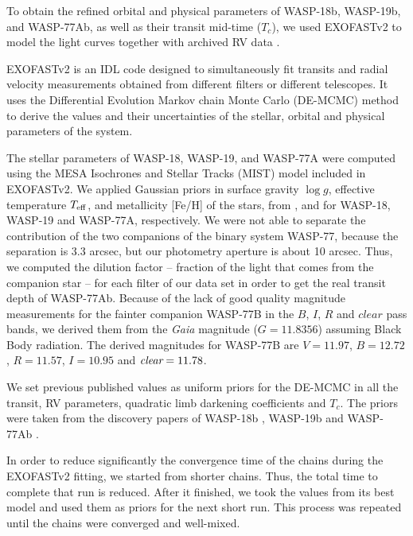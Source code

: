 To obtain the refined orbital and physical parameters of WASP-18b, WASP-19b, and WASP-77Ab, as well as their transit mid-time ($T_{c}$), we used EXOFASTv2 \citep{Eastman2013,Eastman2017} to model the light curves together with archived RV data \cite{Hellier2009, Hebb2010, Maxted2013}.

EXOFASTv2 is an IDL code designed to simultaneously fit transits and radial velocity measurements obtained from different filters or different telescopes. It uses the Differential Evolution Markov chain Monte Carlo (DE-MCMC) method to derive the values and their uncertainties of the stellar, orbital and physical parameters of the system. 

The stellar parameters of WASP-18, WASP-19, and WASP-77A were computed using the MESA Isochrones and Stellar Tracks (MIST) model \citep{Dotter2016} included in EXOFASTv2. We applied Gaussian priors in surface gravity $\log{g}$, effective temperature $T_{\rm eff}$, and metallicity [Fe/H] of the stars, from \cite{Hellier2009},\cite{Hebb2010} and \cite{Maxted2013} for WASP-18, WASP-19 and WASP-77A, respectively. 
We were not able to separate the contribution of the two companions of the binary system WASP-77, because the separation is 3.3 arcsec, but our photometry aperture is about 10 arcsec. Thus, we computed the dilution factor -- fraction of the light that comes from the companion star -- for each filter of our data set in order to get the real transit depth of WASP-77Ab. Because of the lack of good quality magnitude measurements for the fainter companion WASP-77B in the $B$, $I$, $R$ and $clear$ pass bands, we derived them from the \emph{Gaia} magnitude ($G=11.8356$) assuming Black Body radiation. The derived magnitudes for WASP-77B are $V=11.97$, $B=12.72$, $R=11.57$, $I=10.95$ and $\emph{clear}=11.78$.

We set previous published values as uniform priors for the DE-MCMC in all the transit, RV parameters, quadratic limb darkening coefficients and $T_{c}$. The priors were taken from the discovery papers of WASP-18b \citep{Hellier2009}, WASP-19b \citep{Hebb2010} and WASP-77Ab \citep{Maxted2013}. 

In order to reduce significantly the convergence time of the chains during the EXOFASTv2 fitting, we started from shorter chains. Thus, the total time to complete that run is reduced. After it finished, we took the values from its best model and used them as priors for the next short run. This process was repeated until the chains were converged and well-mixed.

